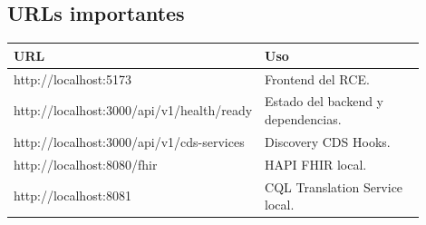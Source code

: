 \subsection{URLs importantes}

\begin{longtable}{>{\ttfamily}p{0.38\linewidth}p{0.52\linewidth}}
\toprule
URL & Uso \\
\midrule
http://localhost:5173 & Frontend del RCE. \\
http://localhost:3000/api/v1/health/ready & Estado del backend y dependencias. \\
http://localhost:3000/api/v1/cds-services & Discovery CDS Hooks. \\
http://localhost:8080/fhir & HAPI FHIR local. \\
http://localhost:8081 & CQL Translation Service local. \\
\bottomrule
\end{longtable}
